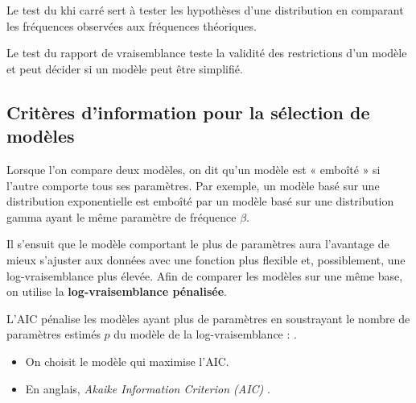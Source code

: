\documentclass[french]{article}
\begin{document}
\begin{multicols*}{2}
Le test du khi carré sert à tester les hypothèses d'une distribution en comparant les fréquences observées aux fréquences théoriques.

\begin{definitionNOHFILLsub}

\end{definitionNOHFILLsub}

Le test du rapport de vraisemblance teste la validité des restrictions d'un modèle et peut décider si un modèle peut être simplifié.
\begin{definitionNOHFILLsub}

\end{definitionNOHFILLsub}

\subsection{Critères d'information pour la sélection de modèles}
Lorsque l'on compare deux modèles, on dit qu'un modèle est « emboîté » si l'autre comporte tous ses paramètres. Par exemple, un modèle basé sur une distribution exponentielle est emboîté par un modèle basé sur une distribution gamma ayant le même paramètre de fréquence $\beta$. 

\bigskip

Il s'ensuit que le modèle comportant le plus de paramètres aura l'avantage de mieux s'ajuster aux données avec une fonction plus flexible et, possiblement, une log-vraisemblance plus élevée. Afin de comparer les modèles sur une même base, on utilise la \textbf{log-vraisemblance pénalisée}.

\begin{definitionNOHFILLsub}
L'AIC pénalise les modèles ayant plus de paramètres en soustrayant le nombre de paramètres estimés $p$ du modèle de la log-vraisemblance : .

\begin{itemize}
	\item	On choisit le modèle qui maximise l'AIC.
	\item	En anglais, \og \textit{Akaike Information Criterion (AIC)} \fg{}.
\end{itemize}
\end{definitionNOHFILLsub}



\end{multicols*}
\end{document}
